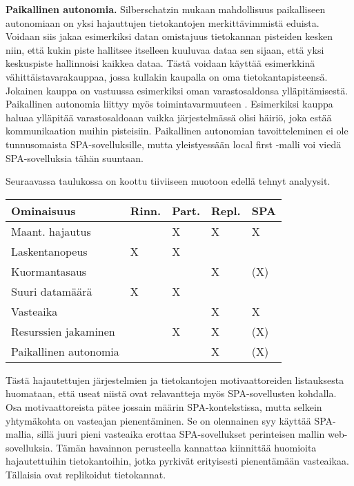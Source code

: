 \documentclass[finnish,twoside,censored,csm,sw-track-2018]{HYthesisML}
\begin{document}
\textbf{Paikallinen autonomia.} Silberschatzin \citep{DSC} mukaan mahdollisuus paikalliseen autonomiaan on yksi hajauttujen tietokantojen merkittävimmistä eduista. Voidaan siis jakaa esimerkiksi datan omistajuus tietokannan pisteiden kesken niin, että kukin piste hallitsee itselleen kuuluvaa dataa sen sijaan, että yksi keskuspiste hallinnoisi kaikkea dataa. Tästä voidaan käyttää esimerkkinä vähittäistavara\-kauppaa, jossa kullakin kaupalla on oma tietokantapisteensä. Jokainen kauppa on vastuussa esimerkiksi oman varastosaldonsa ylläpitämisestä. Paikallinen autonomia liittyy myös toimintavarmuuteen \citep{Date}. Esimerkiksi kauppa haluaa ylläpitää varastosaldoaan vaikka järjestelmässä olisi häiriö, joka estää kommunikaation muihin pisteisiin. Paikallinen autonomian tavoitteleminen ei ole tunnusomaista SPA-sovelluksille, mutta yleistyessään local first -malli \cite{local-first} voi viedä SPA-sovelluksia tähän suuntaan.

Seuraavassa taulukossa on koottu tiiviiseen muotoon edellä tehnyt analyysit.

\begin{center}
\begin{tabular}{ | m{5cm} | m{2cm} | m{2cm} | m{2cm} | m{2cm} | }
 \hline
 \textbf{Ominaisuus} & \textbf{Rinn.} & \textbf{Part.} & \textbf{Repl.} & \textbf{SPA}\\ 
 \hline
 Maant. hajautus &   & X & X & X \\
 \hline
 Laskentanopeus & X & X &   &   \\
 \hline
 Kuormantasaus &   &   & X & (X) \\
 \hline
 Suuri datamäärä & X & X &   &   \\
 \hline
 Vasteaika &   &   & X & X \\
 \hline
 Resurssien jakaminen &   & X & X & (X) \\
 \hline
 Paikallinen autonomia &   &   & X & (X) \\
 \hline
\end{tabular}
\end{center}

Tästä hajautettujen järjestelmien ja tietokantojen motivaattoreiden listauksesta huomataan, että useat niistä ovat relavantteja myös SPA-sovellusten kohdalla. Osa motivaattoreista pätee jossain määrin SPA-kontekstissa, mutta selkein yhtymäkohta on vasteajan pienentäminen. Se on olennainen syy käyttää SPA-mallia, sillä juuri pieni vasteaika erottaa SPA-sovellukset perinteisen mallin web-sovelluksia. Tämän havainnon perusteella kannattaa kiinnittää huomioita hajautettuihin tietokantoihin, jotka pyrkivät erityisesti pienentämään vasteaikaa. Tällaisia ovat replikoidut tietokannat. 
\end{document}

